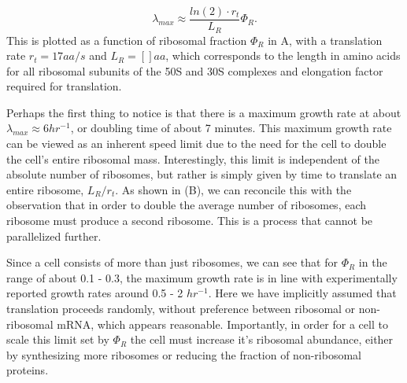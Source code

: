 \begin{equation}
\lambda_{max} \approx \frac{ln(2) \cdot r_t}{L_R}  \Phi_R.
\end{equation}
This is plotted as a function of ribosomal fraction
$\Phi_R$ in A, with a translation rate $r_t = 17 aa/s$ and $L_R = []
aa$, which corresponds to the length in amino acids for all ribosomal subunits of the 50S and 30S complexes
and elongation factor required for translation.

Perhaps the first thing to notice is that there is a maximum growth rate at
about $\lambda_{max} \approx 6 hr^{-1}$, or doubling time of about 7 minutes.
This maximum growth rate can be viewed as an inherent speed limit due to the
need for the cell to double the cell's entire ribosomal mass. Interestingly,
this limit is independent of the absolute number of ribosomes, but rather  is
simply given by time to translate an entire ribosome, $L_R/ r_t$. As shown in
(B),  we can reconcile this with the observation that in
order  to double the average number of ribosomes, each ribosome must produce a
second  ribosome. This is a process that cannot be parallelized further.



Since a cell consists of more than just ribosomes, we can see that for $\Phi_R$
in the range of about 0.1 - 0.3, the maximum growth rate is in line with
experimentally reported growth rates around 0.5 - 2 $hr^{-1}$. Here we have
implicitly assumed that translation proceeds randomly, without preference
between ribosomal or non-ribosomal mRNA, which appears reasonable. Importantly,
in order for a cell to scale this limit set by $\Phi_R$ the cell must increase
it's ribosomal abundance, either by synthesizing more ribosomes or reducing the
fraction of non-ribosomal proteins.

